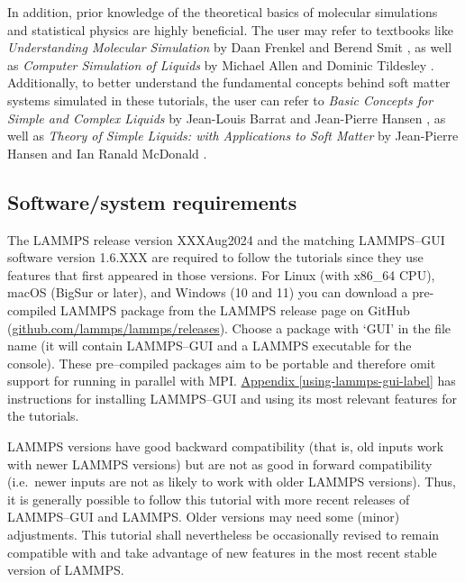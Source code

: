 \documentclass[9pt,tutorial]{livecoms}
\begin{document}
In addition, prior knowledge of the theoretical basics of molecular
simulations and statistical physics are highly beneficial.  The user may
refer to textbooks like \textit{Understanding Molecular Simulation} by
Daan Frenkel and Berend Smit \cite{frenkel2023understanding}, as well as
\textit{Computer Simulation of Liquids} by Michael Allen and Dominic
Tildesley \cite{allen2017computer}.  Additionally, to better understand
the fundamental concepts behind soft matter systems simulated in these
tutorials, the user can refer to \textit{Basic Concepts for Simple and
  Complex Liquids} by Jean-Louis Barrat and Jean-Pierre Hansen
\cite{barrat2003basic}, as well as \textit{Theory of Simple Liquids:
  with Applications to Soft Matter} by Jean-Pierre Hansen and Ian Ranald
McDonald \cite{hansen2013theory}.

\subsection{Software/system requirements}

The LAMMPS release version XXXAug2024 \cite{lammps_code} and the
matching LAMMPS--GUI software version 1.6.XXX are required to follow the
tutorials since they use features that first appeared in those versions.
For Linux (with x86\_64 CPU), macOS (BigSur or later), and Windows (10
and 11) you can download a pre-compiled LAMMPS package from the LAMMPS
release page on GitHub
(\href{https://github.com/lammps/lammps/releases}{github.com/lammps/lammps/releases}).
Choose a package with `GUI' in the file name (it will contain
LAMMPS--GUI and a LAMMPS executable for the console).  These
pre--compiled packages aim to be portable and therefore omit support for
running in parallel with MPI. \hyperref[using-lammps-gui-label]{Appendix
  \ref{using-lammps-gui-label}} has instructions for installing
LAMMPS--GUI and using its most relevant features for the
tutorials.

LAMMPS versions have good backward compatibility (that is, old inputs
work with newer LAMMPS versions) but are not as good in forward
compatibility (i.e.~newer inputs are not as likely to work with older
LAMMPS versions).  Thus, it is generally possible to follow this
tutorial with more recent releases of LAMMPS--GUI and LAMMPS.  Older
versions may need some (minor) adjustments.  This tutorial shall
nevertheless be occasionally revised to remain compatible with and take
advantage of new features in the most recent stable version of LAMMPS.
\end{document}
